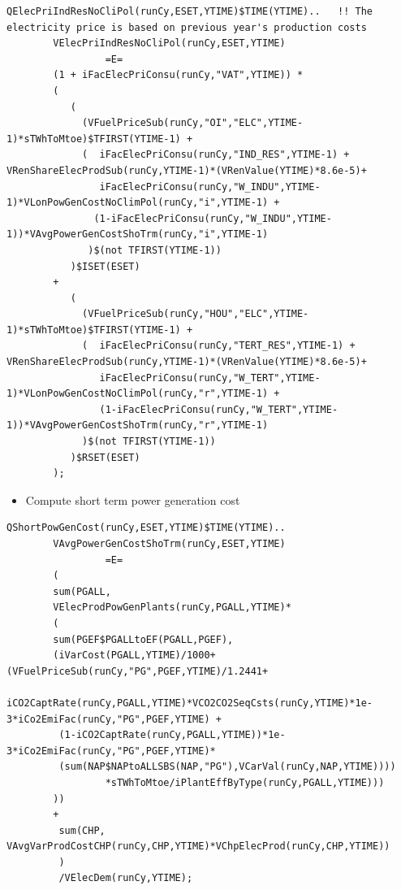 \documentclass[a4paper,]{scrartcl}
\providecommand{\tightlist}{%
  \setlength{\itemsep}{0pt}\setlength{\parskip}{0pt}}
\begin{document}
\begin{lstlisting}
QElecPriIndResNoCliPol(runCy,ESET,YTIME)$TIME(YTIME)..   !! The electricity price is based on previous year's production costs
        VElecPriIndResNoCliPol(runCy,ESET,YTIME)
                 =E=
        (1 + iFacElecPriConsu(runCy,"VAT",YTIME)) *
        (
           (
             (VFuelPriceSub(runCy,"OI","ELC",YTIME-1)*sTWhToMtoe)$TFIRST(YTIME-1) +
             (  iFacElecPriConsu(runCy,"IND_RES",YTIME-1) + VRenShareElecProdSub(runCy,YTIME-1)*(VRenValue(YTIME)*8.6e-5)+
                iFacElecPriConsu(runCy,"W_INDU",YTIME-1)*VLonPowGenCostNoClimPol(runCy,"i",YTIME-1) +
               (1-iFacElecPriConsu(runCy,"W_INDU",YTIME-1))*VAvgPowerGenCostShoTrm(runCy,"i",YTIME-1)
              )$(not TFIRST(YTIME-1))
           )$ISET(ESET)
        +
           (
             (VFuelPriceSub(runCy,"HOU","ELC",YTIME-1)*sTWhToMtoe)$TFIRST(YTIME-1) +
             (  iFacElecPriConsu(runCy,"TERT_RES",YTIME-1) + VRenShareElecProdSub(runCy,YTIME-1)*(VRenValue(YTIME)*8.6e-5)+
                iFacElecPriConsu(runCy,"W_TERT",YTIME-1)*VLonPowGenCostNoClimPol(runCy,"r",YTIME-1) +
                (1-iFacElecPriConsu(runCy,"W_TERT",YTIME-1))*VAvgPowerGenCostShoTrm(runCy,"r",YTIME-1)
             )$(not TFIRST(YTIME-1))
           )$RSET(ESET)
        );
\end{lstlisting}

\begin{itemize}
\tightlist
\item
  Compute short term power generation cost
\end{itemize}

\begin{lstlisting}
QShortPowGenCost(runCy,ESET,YTIME)$TIME(YTIME)..
        VAvgPowerGenCostShoTrm(runCy,ESET,YTIME)
                 =E=
        (
        sum(PGALL,
        VElecProdPowGenPlants(runCy,PGALL,YTIME)*
        (
        sum(PGEF$PGALLtoEF(PGALL,PGEF),
        (iVarCost(PGALL,YTIME)/1000+(VFuelPriceSub(runCy,"PG",PGEF,YTIME)/1.2441+
         iCO2CaptRate(runCy,PGALL,YTIME)*VCO2CO2SeqCsts(runCy,YTIME)*1e-3*iCo2EmiFac(runCy,"PG",PGEF,YTIME) +
         (1-iCO2CaptRate(runCy,PGALL,YTIME))*1e-3*iCo2EmiFac(runCy,"PG",PGEF,YTIME)*
         (sum(NAP$NAPtoALLSBS(NAP,"PG"),VCarVal(runCy,NAP,YTIME))))
                 *sTWhToMtoe/iPlantEffByType(runCy,PGALL,YTIME)))
        ))
        +
         sum(CHP, VAvgVarProdCostCHP(runCy,CHP,YTIME)*VChpElecProd(runCy,CHP,YTIME))
         )
         /VElecDem(runCy,YTIME);
\end{lstlisting}
\end{document}
